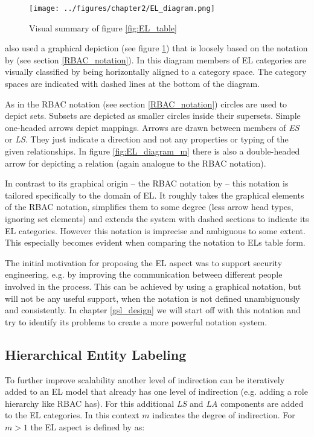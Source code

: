 \documentclass[twoside, openright, 12pt]{book}
\begin{document}
\begin{figure}[htb]
	\centering
	\texttt{[image: ../figures/chapter2/EL\_diagram.png]}
	\caption{Visual summary of figure \ref{fig:EL_table} \cite[p.76, figure 4.3]{Amthor18}}
	\label{fig:EL_diagram}
\end{figure}

\cite{Amthor18} also used a graphical depiction (see figure \ref{fig:EL_diagram}) that is loosely based on the notation by \cite{Sandhu96} (see section \ref{RBAC_notation}).
In this diagram members of EL categories are visually classified by being horizontally aligned to a category space.
The category spaces are indicated with dashed lines at the bottom of the diagram.

As in the RBAC notation (see section \ref{RBAC_notation}) circles are used to depict sets.
Subsets are depicted as smaller circles inside their supersets.
Simple one-headed arrows depict mappings.
Arrows are drawn between members of \textit{ES} or \textit{LS}.
They just indicate a direction and not any properties or typing of the given relationships.
In figure \ref{fig:EL_diagram_m} there is also a double-headed arrow for depicting a relation (again analogue to the RBAC notation).

In contrast to its graphical origin -- the RBAC notation by \cite{Sandhu96} -- this notation is tailored specifically to the domain of EL.
It roughly takes the graphical elements of the RBAC notation, simplifies them to some degree (less arrow head types, ignoring set elements) and extends the system with dashed sections to indicate its EL categories.
However this notation is imprecise and ambiguous to some extent.
This especially becomes evident when comparing the notation to ELs table form.

The initial motivation for proposing the EL aspect was to support security engineering, e.g. by improving the communication between different people involved in the process.
This can be achieved by using a graphical notation, but will not be any useful support, when the notation is not defined unambiguously and consistently.
In chapter \ref{gsl_design} we will start off with this notation and try to identify its problems to create a more powerful notation system.

\subsection{Hierarchical Entity Labeling}
\label{HEL}
To further improve scalability another level of indirection can be iteratively added to an EL model that already has one level of indirection (e.g. adding a role hierarchy like RBAC has).
For this additional \textit{LS} and \textit{LA} components are added to the EL categories.
In this context $m$ indicates the degree of indirection.
For $m>1$ the EL aspect is defined by \cite{Amthor18} as:
\end{document}
